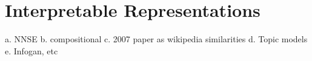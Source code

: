 




\section{Interpretable Representations}\label{ch2:Interpretability}
a. NNSE
b. compositional
c. 2007 paper as wikipedia similarities
d. Topic models\label{bg:TopicModel}
e. Infogan, etc

